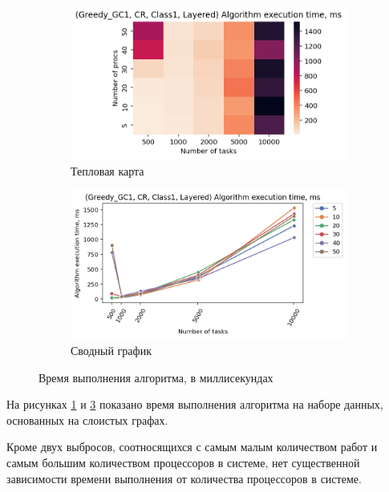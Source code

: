 \begin{figure}[!htbp]
    \centering
    \begin{subfigure}{0.49\textwidth}
        \includegraphics[width=\textwidth]{imgs/layered_class_1/CR/et_heatmap.png}
        \caption{Тепловая карта}
        \label{fig:CR-layered-exec-time-heatmap}
    \end{subfigure}
    \hfill
    \begin{subfigure}{0.49\textwidth}
        \includegraphics[width=\textwidth]{imgs/layered_class_1/CR/tr_graph.png}
        \caption{Сводный график}
        \label{fig:CR-layered-exec-time-compiled}
    \end{subfigure}
    \caption{Время выполнения алгоритма, в миллисекундах}
\end{figure}

На рисунках \ref{fig:CR-layered-exec-time-heatmap} и \ref{fig:CR-layered-exec-time-compiled} показано время выполнения алгоритма на наборе данных, основанных на слоистых графах. 

Кроме двух выбросов, соотносящихся с самым малым количеством работ и самым большим количеством процессоров в системе, нет существенной зависимости времени выполнения от количества процессоров в системе.

